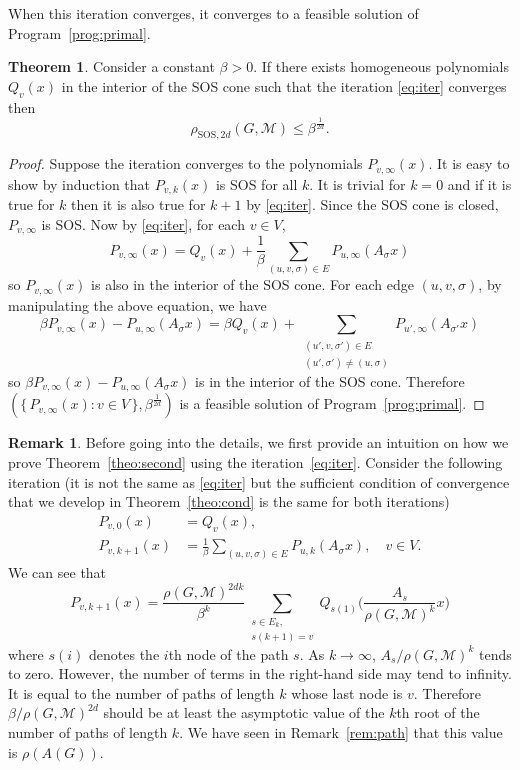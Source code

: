\documentclass{sig-alternate-05-2015}
\newcommand{\1}{\mathbf{1}}
\theoremstyle{definition}
\newtheorem{mytheo}{Theorem}
\newtheorem{myrem}{Remark}
\newcommand{\A}{\mathcal{M}}
\newcommand{\G}{G}
\newcommand{\jsrsos}[1][2d]{\rho_{\mathrm{SOS},#1}(\G,\A)}
\newcommand{\cjsr}{\rho(\G,\A)}
\newcommand{\Nodes}{V}
\newcommand{\node}{node}
\newcommand{\Arcs}{E}
\begin{document}
When this iteration converges, it converges to a feasible solution of Program~\ref{prog:primal}.
\begin{mytheo}
  \label{theo:conv}
  Consider a constant $\beta > 0$.
  If there exists homogeneous polynomials $Q_v(x)$ in the interior of the SOS cone such that
  the iteration \eqref{eq:iter} converges then
  \[
    \jsrsos \leq \beta^{\frac{1}{2d}}.
  \]
  \begin{proof}
    Suppose the iteration converges to the polynomials $P_{v,\infty}(x)$.
    It is easy to show by induction that $P_{v,k}(x)$ is SOS for all $k$.
    It is trivial for $k = 0$ and if it is true for $k$ then it is also true for $k+1$ by \eqref{eq:iter}.
    Since the SOS cone is closed, $P_{v,\infty}$ is SOS.
    Now by \eqref{eq:iter}, for each $v \in \Nodes$,
    \[ P_{v,\infty}(x) = Q_v(x) + \frac{1}{\beta}
    \sum_{(u,v,\sigma) \in \Arcs} P_{u,\infty}(A_\sigma x) \]
    so $P_{v,\infty}(x)$ is also in the interior of the SOS cone.
    For each edge $(u,v,\sigma)$, by manipulating the above equation, we have
    \[ \beta P_{v,\infty}(x) - P_{u,\infty}(A_\sigma x) = \beta Q_v(x) +
    \sum_{\substack{(u',v,\sigma') \in \Arcs\\(u',\sigma') \neq (u, \sigma)}} P_{u',\infty}(A_{\sigma'} x) \]
    so $\beta P_{v,\infty}(x) - P_{u,\infty}(A_\sigma x)$ is in the interior of the SOS cone.
    Therefore $(\{\, P_{v,\infty}(x) : v \in \Nodes \,\}, \beta^{\frac{1}{2d}})$ is a feasible solution of Program~\ref{prog:primal}.
  \end{proof}
\end{mytheo}

\begin{myrem}
  Before going into the details, we first provide an intuition on how we
  prove Theorem~\ref{theo:second} using the iteration~\eqref{eq:iter}.
  Consider the following iteration (it is not the same as
  \eqref{eq:iter} but the sufficient condition of convergence that we
  develop in Theorem~\ref{theo:cond} is the same for both iterations)
  \begin{align*}
    P_{v,0}(x) & = Q_v(x),\\
    P_{v,k+1}(x) & = \frac{1}{\beta}
    \sum_{(u,v,\sigma) \in \Arcs} P_{u,k}(A_\sigma x), \quad  v \in \Nodes.
  \end{align*}
  We can see that
  \begin{equation}
    P_{v,k+1}(x) = \frac{\cjsr^{2dk}}{\beta^k}\sum_{\substack{s \in \Arcs_k,\\s(k+1)=v}} Q_{s(1)}\Big(\frac{A_s}{\cjsr^{k}} x\Big)
  \end{equation}
  where $s(i)$ denotes the $i$th \node{} of the path $s$.
  As $k \to \infty$, $A_s / \cjsr^{k}$ tends to zero.
  However, the number of terms in the right-hand side may tend to infinity.
  It is equal to the number of paths of length $k$ whose last node is $v$.
  Therefore $\beta/\cjsr^{2d}$ should be at least the asymptotic value of the $k$th root of the number of paths of length $k$.
  We have seen in Remark~\ref{rem:path} that this value is $\rho(A(\G))$.
\end{myrem}
\end{document}

